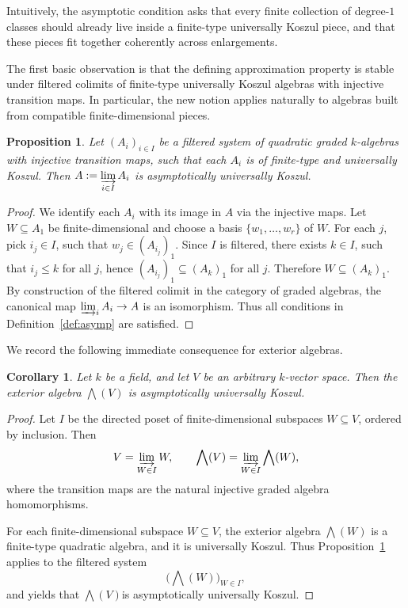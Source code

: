\documentclass[11pt]{amsart}
\numberwithin{equation}{section}
\newtheorem{proposition}[theorem]{Proposition}
\newtheorem{corollary}[theorem]{Corollary}
\theoremstyle{definition}
\begin{document}
	Intuitively, the asymptotic condition asks that every finite collection of degree-$1$ classes should already live inside a finite-type universally Koszul piece, and that these pieces fit together coherently across enlargements.
	
	The first basic observation is that the defining approximation property is stable under filtered colimits of finite-type universally Koszul algebras with injective transition maps. In particular, the new notion applies naturally to algebras built from compatible finite-dimensional pieces.
	
	\begin{proposition}\label{prop:colim}
		Let \((A_i)_{i\in I}\) be a filtered system of quadratic graded $k$-algebras with injective transition maps, such that each \(A_i\) is of finite-type and universally Koszul. Then \(A := \displaystyle \varinjlim_{i\in I} A_i\) is asymptotically universally Koszul.
	\end{proposition}
	
	\begin{proof}
		We identify each \(A_i\) with its image in \(A\) via the injective maps. Let \(W\subseteq A_1\) be finite-dimensional and choose a basis \(\{w_1,\dots,w_r\}\) of \(W\). For each \(j\), pick \(i_j\in I\), such that \(w_j\in (A_{i_j})_1\). Since \(I\) is filtered, there exists \(k\in I\), such that \(i_j\le k\) for all \(j\), hence \((A_{i_j})_1\subseteq (A_k)_1\) for all \(j\). Therefore \(W\subseteq (A_k)_1\). By construction of the filtered colimit in the category of graded algebras, the canonical map \(\varinjlim_i A_i\to A\) is an isomorphism. Thus all conditions in Definition~\ref{def:asymp} are satisfied.
	\end{proof}
	
	We record the following immediate consequence for exterior algebras.
	
	\begin{corollary}
		Let \(k\) be a field, and let \(V\) be an arbitrary \(k\)-vector space. Then the exterior algebra
		$\bigwedge(V)$ is asymptotically universally Koszul.
	\end{corollary}
	
	\begin{proof}
		Let \(I\) be the directed poset of finite-dimensional subspaces \(W\subseteq V\), ordered by inclusion. Then
		\[V=\varinjlim_{W\in I} W, \qquad \bigwedge(V)=\varinjlim_{W\in I}\bigwedge(W),\]
		where the transition maps are the natural injective graded algebra homomorphisms.
		
		For each finite-dimensional subspace \(W\subseteq V\), the exterior algebra \(\bigwedge(W)\) is a finite-type quadratic algebra, and it is universally Koszul. Thus Proposition~\ref{prop:colim} applies to the filtered system
		\[\bigl(\bigwedge(W)\bigr)_{W\in I},\]
		and yields that \(\bigwedge(V)\)is asymptotically universally Koszul.
	\end{proof}
	
\end{document}
